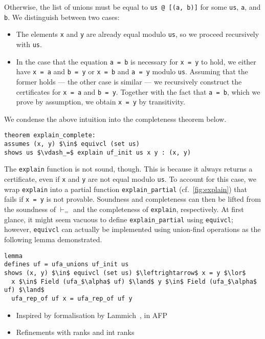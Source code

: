 \documentclass[
  sigplan,
  10pt,
  anonymous,
  review,
  ]{acmart}
\begin{document}
Otherwise, the list of unions must be equal to \lstinline|us @ [(a, b)]| for some \lstinline|us|, \lstinline|a|, and \lstinline|b|.
We distinguish between two cases:
\begin{itemize}
  \item The elements \lstinline|x| and \lstinline|y| are already equal modulo \lstinline|us|, so we proceed recursively with \lstinline|us|.
  \item In the case that the equation \lstinline|a = b| is necessary for \lstinline|x = y| to hold, we either have \lstinline|x = a| and \lstinline|b = y| or \lstinline|x = b| and \lstinline|a = y| modulo \lstinline|us|.
    Assuming that the former holds --- the other case is similar --- we recursively construct the certificates for \lstinline|x = a| and \lstinline|b = y|.
    Together with the fact that \lstinline|a = b|, which we prove by assumption, we obtain \lstinline|x = y| by transitivity.
\end{itemize}

We condense the above intuition into the completeness theorem below.
\begin{lstlisting}
theorem explain_complete:
assumes (x, y) $\in$ equivcl (set us)
shows us $\vdash_=$ explain uf_init us x y : (x, y)
\end{lstlisting}

The \lstinline|explain| function is not sound, though.
This is because it always returns a certificate, even if \lstinline|x| and \lstinline|y| are not equal modulo \lstinline|us|.
To account for this case, we wrap \lstinline|explain| into a partial function \lstinline|explain_partial| (cf.\ \autoref{fig:explain}) that fails if \lstinline|x = y| is not provable.
Soundness and completeness can then be lifted from the soundness of $\vdash_=$ and the completeness of \lstinline|explain|, respectively.
At first glance, it might seem vacuous to define \lstinline|explain_partial| using \lstinline|equivcl|;
however, \lstinline|equivcl| can actually be implemented using union-find operations as the following lemma demonstrated.
\begin{lstlisting}
lemma
defines uf = ufa_unions uf_init us
shows (x, y) $\in$ equivcl (set us) $\leftrightarrow$ x = y $\lor$
  x $\in$ Field (ufa_$\alpha$ uf) $\land$ y $\in$ Field (ufa_$\alpha$ uf) $\land$
  ufa_rep_of uf x = ufa_rep_of uf y
\end{lstlisting}

\begin{itemize}
  \item Inspired by formalisation by Lammich~\cite{unionfind_isabelle}, in AFP~\cite{union_find_afp}
  \item Refinements with ranks and int ranks
\end{itemize}
\end{document}
